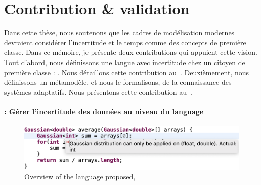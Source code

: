 \section{Contribution \& validation}

%
Dans cette thèse, nous soutenons que les cadres de modélisation modernes devraient considérer l'incertitude et le temps comme des concepts de première classe.
Dans ce mémoire, je présente deux contributions qui appuient cette vision.
Tout d'abord, nous définissons une langue avec incertitude chez un citoyen de première classe : \langName. 
Nous détaillons cette contribution au~. 
Deuxièmement, nous définissons un métamodèle, et nous le formalisons, de la connaissance des systèmes adaptatifs. 
Nous présentons cette contribution au~.

\paragraph{\langName{}: Gérer l'incertitude des données au niveau du language}
\begin{figure}
	\centering
	\includegraphics[width=\linewidth]{img/chapt-intro/approach/aintea-overview}
	\caption{Overview of the language proposed, \langName{}}
	\label{fig:french:contrib:aintea}
\end{figure}

